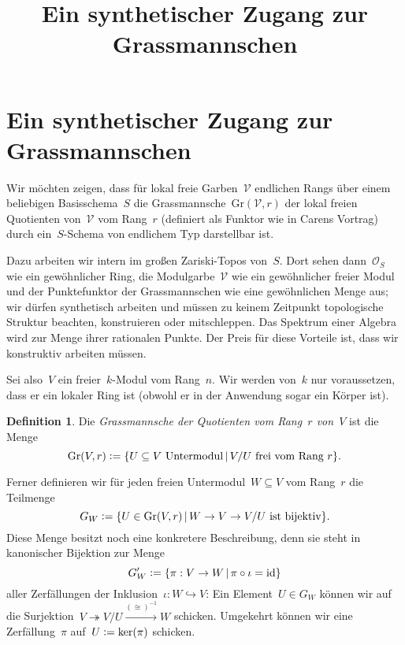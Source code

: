 \documentclass[a4paper,ngerman,12pt]{scrartcl}
\theoremstyle{definition}
\newtheorem{defn}{Definition}
\theoremstyle{plain}
\theoremstyle{remark}
\renewcommand{\O}{\mathcal{O}}
\newcommand{\id}{\mathrm{id}}
\newcommand{\defeq}{\vcentcolon=}
\newcommand{\Gr}{\mathrm{Gr}}
\begin{document}
\title{Ein synthetischer Zugang zur Grassmannschen}
\author{}

\section*{Ein synthetischer Zugang zur Grassmannschen}

Wir möchten zeigen, dass für lokal freie Garben~$\mathcal{V}$ endlichen Rangs
über einem beliebigen Basisschema~$S$ die Grassmannsche~$\Gr(\mathcal{V},r)$
der lokal freien Quotienten von~$\mathcal{V}$ vom Rang~$r$ (definiert als
Funktor wie in Carens Vortrag) durch ein~$S$-Schema von endlichem Typ
darstellbar ist.

Dazu arbeiten wir intern im großen Zariski-Topos von~$S$. Dort sehen
dann~$\O_S$ wie ein gewöhnlicher Ring, die Modulgarbe~$\mathcal{V}$ wie ein
gewöhnlicher freier Modul und der Punktefunktor der Grassmannschen wie eine
gewöhnlichen Menge aus; wir dürfen synthetisch arbeiten und müssen zu keinem
Zeitpunkt topologische Struktur beachten, konstruieren oder mitschleppen. Das
Spektrum einer Algebra wird zur Menge ihrer rationalen Punkte. Der Preis für
diese Vorteile ist, dass wir konstruktiv arbeiten müssen.

Sei also~$V$ ein freier~$k$-Modul vom Rang~$n$. Wir werden von~$k$
nur voraussetzen, dass er ein lokaler Ring ist (obwohl er in der Anwendung
sogar ein Körper ist).

\begin{defn}Die \emph{Grassmannsche der Quotienten vom Rang~$r$ von~$V$} ist
die Menge
\[ \Gr(V,r) \defeq \{ \text{$U \subseteq V$ Untermodul} \,|\, \text{$V/U$ frei
vom Rang~$r$} \}. \]
\end{defn}

Ferner definieren wir für jeden freien Untermodul~$W \subseteq V$ vom Rang~$r$
die Teilmenge
\[ G_W \defeq \{ U \in \Gr(V,r) \,|\, \text{$W \to V \to V/U$ ist bijektiv} \}. \]
Diese Menge besitzt noch eine konkretere Beschreibung, denn sie steht in
kanonischer Bijektion zur Menge
\[ G_W' \defeq \{ \pi : V \to W \,|\, \pi \circ \iota = \id \} \]
aller Zerfällungen der Inklusion~$\iota : W \hookrightarrow V$: Ein Element~$U
\in G_W$ können wir auf die Surjektion~$V \twoheadrightarrow V/U
\xrightarrow{({\cong})^{-1}} W$ schicken. Umgekehrt können wir eine
Zerfällung~$\pi$ auf~$U \defeq \ker(\pi)$ schicken.
\end{document}
